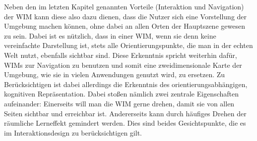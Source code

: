 Neben den im letzten Kapitel genannten Vorteile (Interaktion und Navigation) der WIM kann diese also dazu dienen, dass die Nutzer sich eine Vorstellung der Umgebung machen können, ohne dabei an allen Orten der Hauptszene gewesen zu sein. Dabei ist es nützlich, dass in einer WIM, wenn sie denn keine vereinfachte Darstellung ist, stets alle Orientierungspunkte, die man in der echten Welt nutzt, ebenfalls sichtbar sind.
Diese Erkenntnis spricht weiterhin dafür, WIMs zur Navigation zu benutzen und somit eine zweidimensionale Karte der Umgebung, wie sie in vielen Anwendungen genutzt wird, zu ersetzen.
Zu Berücksichtigen ist dabei allerdings die Erkenntnis des orientierungsabhängigen, kognitiven Repräsentation. Dabei stoßen nämlich zwei zentrale Eigenschaften aufeinander: Einerseits will man die WIM gerne drehen, damit sie von allen Seiten sichtbar und erreichbar ist. Andererseits kann durch häufiges Drehen der räumliche Lerneffekt gemindert werden. Dies sind beides Gesichtspunkte, die es im Interaktionsdesign zu berücksichtigen gilt.